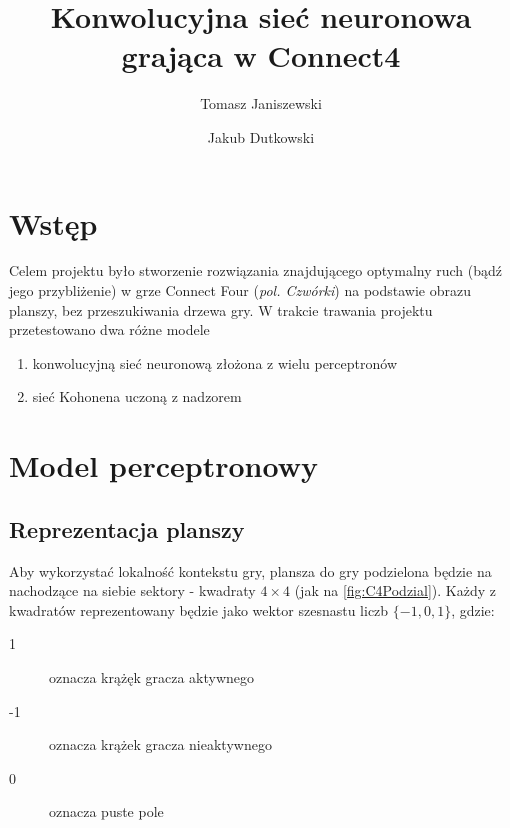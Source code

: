 \documentclass{llncs}
\begin{document}
\title{Konwolucyjna sieć neuronowa grająca w Connect4}
%
%
\author{Tomasz Janiszewski \and Jakub Dutkowski}
%
%


\maketitle              %

%
\section{Wstęp}
Celem projektu było stworzenie rozwiązania znajdującego optymalny ruch (bądź jego przybliżenie) w grze Connect Four (\emph{pol. Czwórki}) \cite{connect4:wiki} na podstawie obrazu planszy, bez przeszukiwania drzewa gry. 
W trakcie trawania projektu przetestowano dwa różne modele
\begin{enumerate}
	\item konwolucyjną sieć neuronową złożona z wielu perceptronów
	\item sieć Kohonena uczoną z nadzorem
\end{enumerate}

\section{Model perceptronowy}

\subsection{Reprezentacja planszy}
\label{sec:reprezentacja}
Aby wykorzystać lokalność kontekstu gry, plansza do gry podzielona będzie na nachodzące na siebie sektory - kwadraty $4 \times 4$ (jak na \autoref{fig:C4Podzial}). 
Każdy z kwadratów reprezentowany będzie jako wektor szesnastu liczb $\{-1, 0, 1\}$, gdzie:
\begin{description}
	\item[1] oznacza krążęk gracza aktywnego
	\item[-1] oznacza krążek gracza nieaktywnego
	\item[0] oznacza puste pole
\end{description} 
\end{document}
